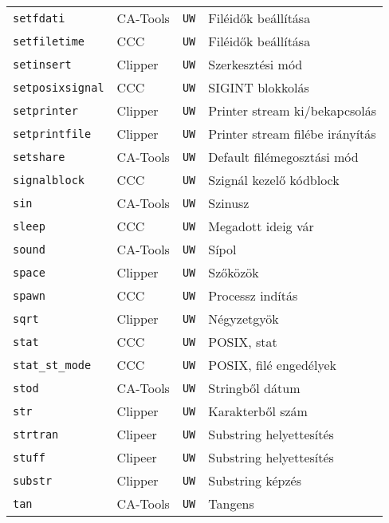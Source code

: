 \begin{tabular}{|l|l|l|l|}
\verb!setfdati!                    & CA-Tools &  {\tt UW} & Filéidők beállítása\\
\verb!setfiletime!                 & CCC      &  {\tt UW} & Filéidők beállítása\\
\verb!setinsert!                   & Clipper  &  {\tt UW} & Szerkesztési mód\\
\verb!setposixsignal!              & CCC      &  {\tt UW} & SIGINT blokkolás\\
\verb!setprinter!                  & Clipper  &  {\tt UW} & Printer stream ki/bekapcsolás\\
\verb!setprintfile!                & Clipper  &  {\tt UW} & Printer stream filébe irányítás\\
\verb!setshare!                    & CA-Tools &  {\tt UW} & Default filémegosztási mód\\
\verb!signalblock!                 & CCC      &  {\tt UW} & Szignál kezelő kódblock\\
\verb!sin!                         & CA-Tools &  {\tt UW} & Szinusz\\
\verb!sleep!                       & CCC      &  {\tt UW} & Megadott ideig vár\\
\verb!sound!                       & CA-Tools &  {\tt UW} & Sípol\\
\verb!space!                       & Clipper  &  {\tt UW} & Szőközök\\
\verb!spawn!                       & CCC      &  {\tt UW} & Processz indítás\\
\verb!sqrt!                        & Clipper  &  {\tt UW} & Négyzetgyök\\
\verb!stat!                        & CCC      &  {\tt UW} & POSIX, stat\\
\verb!stat_st_mode!                & CCC      &  {\tt UW} & POSIX, filé engedélyek\\
\verb!stod!                        & CA-Tools &  {\tt UW} & Stringből dátum\\
\verb!str!                         & Clipper  &  {\tt UW} & Karakterből szám\\
\verb!strtran!                     & Clipeer  &  {\tt UW} & Substring helyettesítés\\ 
\verb!stuff!                       & Clipeer  &  {\tt UW} & Substring helyettesítés\\
\verb!substr!                      & Clipper  &  {\tt UW} & Substring képzés\\
\verb!tan!                         & CA-Tools &  {\tt UW} & Tangens\\

\end{tabular}
